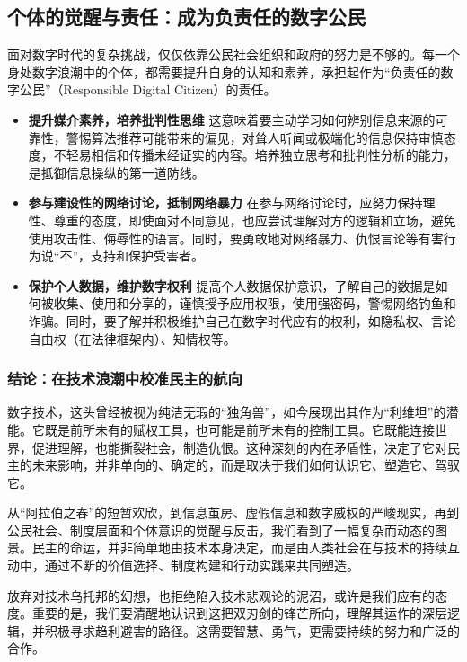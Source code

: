 \documentclass[UTF8, 10pt]{ctexbook}
\begin{document}
\subsection{个体的觉醒与责任：成为负责任的数字公民}
面对数字时代的复杂挑战，仅仅依靠公民社会组织和政府的努力是不够的。每一个身处数字浪潮中的个体，都需要提升自身的认知和素养，承担起作为“负责任的数字公民”（Responsible Digital Citizen）的责任。
\begin{itemize}
    \item \textbf{提升媒介素养，培养批判性思维}
    这意味着要主动学习如何辨别信息来源的可靠性，警惕算法推荐可能带来的偏见，对耸人听闻或极端化的信息保持审慎态度，不轻易相信和传播未经证实的内容。培养独立思考和批判性分析的能力，是抵御信息操纵的第一道防线。

    \item \textbf{参与建设性的网络讨论，抵制网络暴力}
    在参与网络讨论时，应努力保持理性、尊重的态度，即使面对不同意见，也应尝试理解对方的逻辑和立场，避免使用攻击性、侮辱性的语言。同时，要勇敢地对网络暴力、仇恨言论等有害行为说“不”，支持和保护受害者。

    \item \textbf{保护个人数据，维护数字权利}
    提高个人数据保护意识，了解自己的数据是如何被收集、使用和分享的，谨慎授予应用权限，使用强密码，警惕网络钓鱼和诈骗。同时，要了解并积极维护自己在数字时代应有的权利，如隐私权、言论自由权（在法律框架内）、知情权等。
\end{itemize}

\subsubsection*{结论：在技术浪潮中校准民主的航向}
数字技术，这头曾经被视为纯洁无瑕的“独角兽”，如今展现出其作为“利维坦”的潜能。它既是前所未有的赋权工具，也可能是前所未有的控制工具。它既能连接世界，促进理解，也能撕裂社会，制造仇恨。这种深刻的内在矛盾性，决定了它对民主的未来影响，并非单向的、确定的，而是取决于我们如何认识它、塑造它、驾驭它。

从“阿拉伯之春”的短暂欢欣，到信息茧房、虚假信息和数字威权的严峻现实，再到公民社会、制度层面和个体意识的觉醒与反击，我们看到了一幅复杂而动态的图景。民主的命运，并非简单地由技术本身决定，而是由人类社会在与技术的持续互动中，通过不断的价值选择、制度构建和行动实践来共同塑造。

放弃对技术乌托邦的幻想，也拒绝陷入技术悲观论的泥沼，或许是我们应有的态度。重要的是，我们要清醒地认识到这把双刃剑的锋芒所向，理解其运作的深层逻辑，并积极寻求趋利避害的路径。这需要智慧、勇气，更需要持续的努力和广泛的合作。
\end{document}
